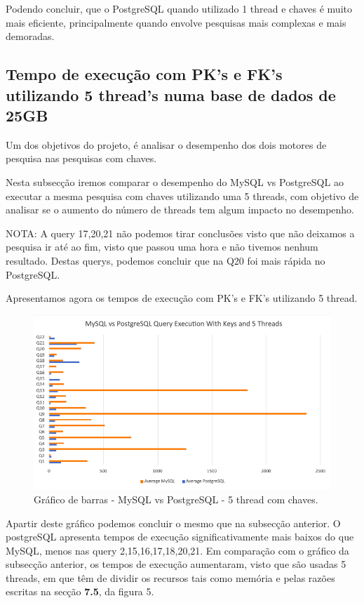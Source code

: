 \documentclass{article}
\begin{document}
Podendo concluir, que o PostgreSQL quando utilizado 1 thread e chaves é muito mais eficiente, principalmente quando envolve pesquisas mais complexas e mais demoradas.

\clearpage
\subsection{Tempo de execução com PK's e FK's utilizando 5 thread's numa base
de dados de 25GB}

Um dos objetivos do projeto, é analisar o desempenho dos dois motores de pesquisa nas pesquisas com chaves.

Nesta subsecção iremos comparar o desempenho do MySQL vs PostgreSQL ao executar a mesma pesquisa com chaves utilizando uma 5 threads, com objetivo de analisar se o aumento do número de threads tem algum impacto no desempenho.


NOTA: A query 17,20,21 não podemos tirar conclusões visto que não deixamos a pesquisa ir até ao fim, visto que passou uma hora e não tivemos nenhum resultado. Destas querys, podemos concluir que na Q20 foi mais rápida no PostgreSQL.



Apresentamos agora os tempos de execução com PK's e FK's utilizando 5 thread.
\begin{figure}[H]
  \centering
  \includegraphics[width=\textwidth]{Graphs/mysqlvspostgres_withkeys_fivethreads.png}
  \caption{Gráfico de barras - MySQL vs PostgreSQL - 5 thread com chaves.}
  \label{fig:PKCreation2}
\end{figure}


\quad Apartir deste gráfico podemos concluir o mesmo que na subsecção anterior. O postgreSQL apresenta tempos de execução significativamente mais baixos do que MySQL, menos nas query 2,15,16,17,18,20,21.
\quad Em comparação com o gráfico da subsecção anterior, os tempos de execução aumentaram, visto que são usadas 5 threads, em que têm de dividir os recursos tais como memória e pelas razões escritas na secção \textbf{7.5}, da figura 5. 
\end{document}
